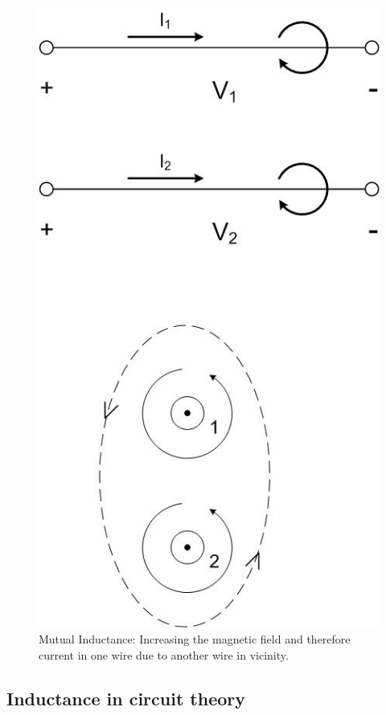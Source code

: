 \documentclass{ximera}
\begin{document}
\begin{figure}[htbp]
\begin{center}
\includegraphics[scale=0.5]{../jpg/increaseinflux.jpg}
\end{center}
\caption{Mutual Inductance: Increasing the magnetic field and therefore current in one wire due to another wire in vicinity. }
\label{MutualInduc3}
\end{figure}




\subsection{Inductance in circuit theory}
\end{document}

